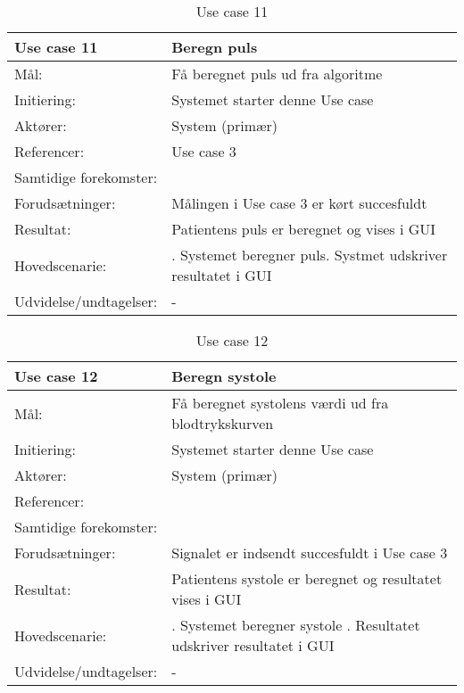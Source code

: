 \begin{table}[h!]
\caption{Use case 11}\label{tab:tabel3}
\begin{tabular}{| l | >{\raggedright\arraybackslash}p{11cm} |}
   \hline
   \textbf{Use case 11} & \textbf{Beregn puls}\\ \hline
   Mål: & Få beregnet puls ud fra algoritme \\ \hline
   Initiering: & Systemet starter denne Use case\\ \hline
   Aktører:& System (primær)\\ \hline
   Referencer: & Use case 3 \\ \hline
   Samtidige forekomster: & \\\hline
   Forudsætninger: & Målingen i Use case 3 er kørt succesfuldt\\ \hline
   Resultat:& Patientens puls er beregnet og vises i GUI\\ \hline
   Hovedscenarie:& 
1. Systemet beregner puls\newline
2. Systmet udskriver resultatet i GUI\\\hline
Udvidelse/undtagelser: & -\\\hline
\end{tabular}
\end{table}


\begin{table}[h!]
\caption{Use case 12}\label{tab:tabel3}
\begin{tabular}{| l | >{\raggedright\arraybackslash}p{11cm} |}
   \hline
   \textbf{Use case 12} & \textbf{Beregn systole}\\ \hline
   Mål: & Få beregnet systolens værdi ud fra blodtrykskurven\\ \hline
   Initiering: & Systemet starter denne Use case\\ \hline
   Aktører:& System (primær)\\ \hline
   Referencer: & \\ \hline
   Samtidige forekomster: & \\\hline
   Forudsætninger: & Signalet er indsendt succesfuldt i Use case 3 \\ \hline
   Resultat:& Patientens systole er beregnet og resultatet vises i GUI\\ \hline
   Hovedscenarie:& 
1. Systemet beregner systole \newline
2. Resultatet udskriver resultatet i GUI \\\hline
Udvidelse/undtagelser: & -\\\hline
\end{tabular}
\end{table}


